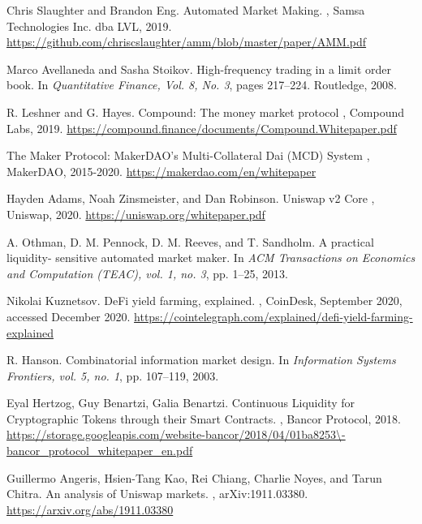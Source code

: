 \documentclass{article}
\begin{document}
  

\begin{thebibliography}{1}

Chris Slaughter and Brandon Eng.
\newblock Automated Market Making.
, Samsa Technologies Inc. dba LVL, 2019. 
\newblock \url{https://github.com/chriscslaughter/amm/blob/master/paper/AMM.pdf}

Marco Avellaneda and Sasha Stoikov.
\newblock High-frequency trading in a limit order book.
\newblock In {\em Quantitative Finance, Vol. 8, No. 3}, pages 217--224. Routledge, 2008.

R. Leshner and G. Hayes.
\newblock Compound: The money market protocol
, Compound Labs, 2019.
\newblock \url{https://compound.finance/documents/Compound.Whitepaper.pdf}

The Maker Protocol: MakerDAO's Multi-Collateral Dai (MCD) System
, MakerDAO, 2015-2020.
\newblock \url{https://makerdao.com/en/whitepaper}

Hayden Adams, Noah Zinsmeister, and Dan Robinson.
\newblock Uniswap v2 Core
, Uniswap, 2020.
\newblock \url{https://uniswap.org/whitepaper.pdf}

A. Othman, D. M. Pennock, D. M. Reeves, and T. Sandholm.
\newblock A practical liquidity- sensitive automated market maker.
\newblock In {\em ACM Transactions on Economics and Computation (TEAC), vol. 1, no. 3}, pp. 1–25, 2013.

Nikolai Kuznetsov.
\newblock DeFi yield farming, explained.
, CoinDesk, September 2020, accessed December 2020.
\newblock \url{https://cointelegraph.com/explained/defi-yield-farming-explained}

R. Hanson.
\newblock Combinatorial information market design.
\newblock In {\em Information Systems Frontiers, vol. 5, no. 1}, pp. 107–119, 2003.

Eyal Hertzog, Guy Benartzi, Galia Benartzi.
\newblock Continuous Liquidity for Cryptographic Tokens through their Smart Contracts.
, Bancor Protocol, 2018.
\newblock \url{https://storage.googleapis.com/website-bancor/2018/04/01ba8253\-bancor_protocol_whitepaper_en.pdf}

Guillermo Angeris, Hsien-Tang Kao, Rei Chiang, Charlie Noyes, and Tarun Chitra.
\newblock An analysis of Uniswap markets.
, arXiv:1911.03380.
\newblock \url{https://arxiv.org/abs/1911.03380}

\end{thebibliography}
\end{document}
